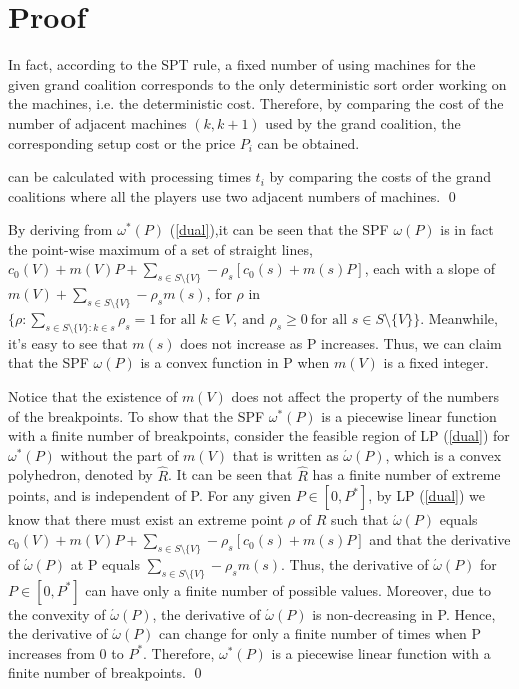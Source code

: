 \clearpage
\section*{Proof}

\begin{pf}[Lemma 1]
  In fact, according to the SPT rule, a fixed number of using machines for the given grand coalition corresponds to the only deterministic sort order working on the machines, i.e. the deterministic cost. Therefore, by comparing the cost of the number of adjacent machines $(k, k + 1)$ used by the grand coalition, the corresponding setup cost or the price $P_i$ can be obtained.

can be calculated with processing times $t_i$ by comparing the costs of the grand coalitions where all the players use two adjacent numbers of machines.
  \qed
\end{pf}

\begin{pf}[Theorem 1]

By deriving from $\omega^* (P)$ (\ref{dual}),it can be seen that the SPF $\omega(P)$ is in fact the point-wise maximum of a set of straight lines, $c_0(V)+m(V)P+\sum_{s\in S\setminus\{V\}}-\rho_s[c_0(s)+m(s)P]$, each with a slope of $m(V)+\sum_{s\in S\setminus\{V\}} −\rho_s m(s)$, for $\rho$ in $\{\rho :\sum_{s\in S\setminus \{V\}:k\in s} \rho_s=1\  \text{for all }  k\in V,\ \text{and } \rho_s \geq 0\ \text{for all } s\in S\setminus \{V\} \}$.
Meanwhile, it's easy to see that $m(s)$ does not increase as P increases. Thus, we can claim that the SPF $\omega(P)$ is a convex function in P when $m(V)$ is a fixed integer.

Notice that the existence of $m(V)$ does not affect the property of the numbers of the breakpoints.
To show that the SPF $\omega^* (P)$ is a piecewise linear function with a ﬁnite number of breakpoints, consider the feasible region of LP (\ref{dual}) for $\omega^* (P)$ without the part of $m(V)$ that is written as $\acute{\omega} (P)$, which is a convex polyhedron, denoted by $\hat{R}$. It can be seen that $\hat{R}$ has a ﬁnite number of extreme points, and is independent of P. For any given $P \in [0,P^*]$, by LP (\ref{dual}) we know that there must exist an extreme point $\rho$ of $\hat{R}$ such that $\acute{\omega} (P)$ equals
$c_0(V)+m(V)P+\sum_{s\in S\setminus\{V\}}-\rho_s[c_0(s)+m(s)P]$
and that the derivative of $\acute{\omega} (P)$ at P equals $\sum_{s\in S\setminus\{V\}} −\rho_s m(s)$. Thus, the derivative of $\acute{\omega} (P)$ for $P \in [0,P^*]$ can have only a ﬁnite number of possible values. Moreover, due to the convexity of $\acute{\omega} (P)$, the derivative of $\acute{\omega} (P)$ is non-decreasing in P. Hence, the derivative of $\acute{\omega} (P)$ can change for only a ﬁnite number of times when P increases from 0 to $P^*$. Therefore, $\omega^* (P)$ is a piecewise linear function with a ﬁnite number of breakpoints.
\qed
\end{pf}



